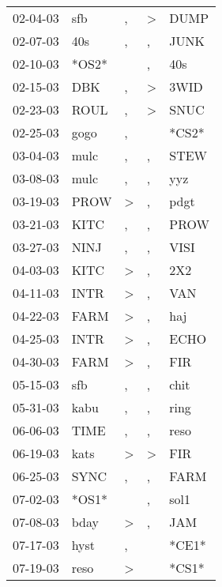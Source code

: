 \begin{supertabular}{lllll}
 02-04-03 &    sfb &                , &  \textgreater &   DUMP \\
 02-07-03 &    40s &                , &             , &   JUNK \\
 02-10-03 &  *OS2* &                  &             , &    40s \\
 02-15-03 &    DBK &                , &  \textgreater &   3WID \\
 02-23-03 &   ROUL &                , &  \textgreater &   SNUC \\
 02-25-03 &   gogo &                , &               &  *CS2* \\
 03-04-03 &   mulc &                , &             , &   STEW \\
 03-08-03 &   mulc &                , &             , &    yyz \\
 03-19-03 &   PROW &     \textgreater &             , &   pdgt \\
 03-21-03 &   KITC &                , &             , &   PROW \\
 03-27-03 &   NINJ &                , &             , &   VISI \\
 04-03-03 &   KITC &     \textgreater &             , &    2X2 \\
 04-11-03 &   INTR &     \textgreater &             , &    VAN \\
 04-22-03 &   FARM &     \textgreater &             , &    haj \\
 04-25-03 &   INTR &     \textgreater &             , &   ECHO \\
 04-30-03 &   FARM &     \textgreater &             , &    FIR \\
 05-15-03 &    sfb &                , &             , &   chit \\
 05-31-03 &   kabu &                , &             , &   ring \\
 06-06-03 &   TIME &                , &             , &   reso \\
 06-19-03 &   kats &     \textgreater &  \textgreater &    FIR \\
 06-25-03 &   SYNC &                , &             , &   FARM \\
 07-02-03 &  *OS1* &                  &             , &   sol1 \\
 07-08-03 &   bday &     \textgreater &             , &    JAM \\
 07-17-03 &   hyst &                , &               &  *CE1* \\
 07-19-03 &   reso &     \textgreater &               &  *CS1* \\

\end{supertabular}
